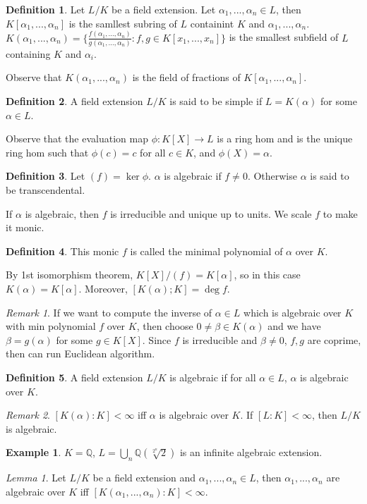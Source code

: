 \documentclass{article}
\theoremstyle{definition}
\newtheorem*{defn*}{Definition}
\newtheorem{example}[defn]{Example}
\theoremstyle{remark}
\newtheorem{rem}{Remark}
\newtheorem{lem}[defn]{Lemma}
\theoremstyle{plain}
\newcommand{\QQ}{\mathbb{Q}}
\begin{document}
\begin{defn*}
    Let $L/K$ be a field extension. Let $\alpha_1,...,\alpha_n\in L$, then $K[\alpha_1,...,\alpha_n]$ is the samllest subring of $L$ containint $K$ and $\alpha_1,...,\alpha_n$. $K(\alpha_1,...,\alpha_n)=\{\frac{f(\alpha_1,...,\alpha_n)}{g(\alpha_1,...,\alpha_n)}:f,g\in K[x_1,...,x_n]\}$ is the smallest subfield of $L$ containing $K$ and $\alpha_i$.
\end{defn*}
Observe that $K(\alpha_1,...,\alpha_n)$ is the field of fractions of $K[\alpha_1,...,\alpha_n]$.
\begin{defn*}
    A field extension $L/K$ is said to be simple if $L=K(\alpha)$ for some $\alpha\in L$.
\end{defn*}
Observe that the evaluation map $\phi:K[X]\to L$ is a ring hom and is the unique ring hom such that $\phi(c)=c$ for all $c\in K$, and $\phi(X)=\alpha$.
\begin{defn*}
    Let $(f)=\ker\phi$. $\alpha$ is algebraic if $f\neq 0$. Otherwise $\alpha$ is said to be transcendental.
\end{defn*}
If $\alpha$ is algebraic, then $f$ is irreducible and unique up to units. We scale $f$ to make it monic.
\begin{defn*}
    This monic $f$ is called the minimal polynomial of $\alpha$ over $K$.
\end{defn*}
By 1st isomorphism theorem, $K[X]/(f)=K[\alpha]$, so in this case $K(\alpha)=K[\alpha]$. Moreover, $[K(\alpha);K]=\deg f$.
\begin{rem}
    If we want to compute the inverse of $\alpha\in L$ which is algebraic over $K$ with min polynomial $f$ over $K$, then choose $0\neq\beta\in K(\alpha)$ and we have $\beta=g(\alpha)$ for some $g\in K[X]$. Since $f$ is irreducible and $\beta\neq 0$, $f,g$ are coprime, then can run Euclidean algorithm.
\end{rem}
\begin{defn*}
    A field extension $L/K$ is algebraic if for all $\alpha\in L$, $\alpha$ is algebraic over $K$.
\end{defn*}
\begin{rem}
    $[K(\alpha):K]<\infty$ iff $\alpha$ is algebraic over $K$.
    If $[L:K]<\infty$, then $L/K$ is algebraic.
\end{rem}
\begin{example}
    $K=\QQ$, $L=\bigcup_n\QQ(\sqrt[2^n]{2})$ is an infinite algebraic extension.
\end{example}
\begin{lem}
    Let $L/K$ be a field extension and $\alpha_1,...,\alpha_n\in L$, then $\alpha_1,...,\alpha_n$ are algebraic over $K$ iff $[K(\alpha_1,...,\alpha_n):K]<\infty$.
\end{lem}
\end{document}
